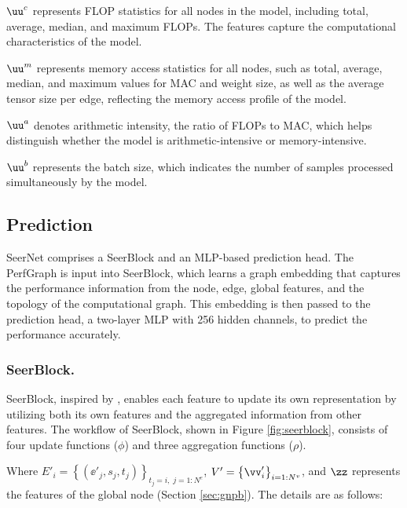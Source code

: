     $\uu^{c}$ represents FLOP statistics for all nodes in the model, including total, average, median, and maximum FLOPs. The features capture the computational characteristics of the model.
    
    $\uu^{m}$ represents memory access statistics for all nodes, such as total, average, median, and maximum values for MAC and weight size, as well as the average tensor size per edge, reflecting the memory access profile of the model.
    
    $\uu^{a}$ denotes arithmetic intensity, the ratio of FLOPs to MAC, which helps distinguish whether the model is arithmetic-intensive or memory-intensive.
    
    $\uu^{b}$ represents the batch size, which indicates the number of samples processed simultaneously by the model.

\subsection{Prediction}\label{sec:seernet}
SeerNet comprises a SeerBlock and an MLP-based prediction head.
The PerfGraph is input into SeerBlock, which learns a graph embedding that captures the performance information from the node, edge, global features, and the topology of the computational graph. This embedding is then passed to the prediction head, a two-layer MLP with 256 hidden channels, to predict the performance accurately.
\subsubsection{SeerBlock.}\label{sec:seerblock}
SeerBlock, inspired by \cite{gn}, enables each feature to update its own representation by utilizing both its own features and the aggregated information from other features.
The workflow of SeerBlock, shown in Figure \ref{fig:seerblock}, consists of four update functions ($\phi$) and three aggregation functions ($\rho$). 

Where $E'_i = \left\{\left(\ee'_j, s_j, t_j \right)\right\}_{t_j=i,\; j=1:N^e}$, $V'=\left\{\vv'_i\right\}_{i=1:N^v}$, and $\zz$ represents the features of the global node (Section \ref{sec:gnpb}). The details are as follows:

